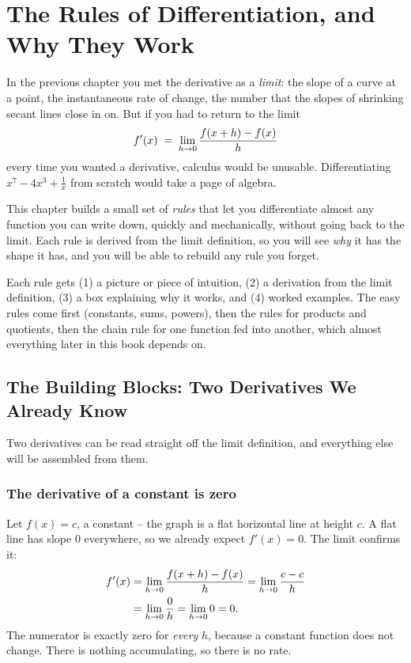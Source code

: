 \chapter{The Rules of Differentiation, and Why They Work}

In the previous chapter you met the derivative as a \emph{limit}: the slope of a curve
at a point, the instantaneous rate of change, the number that the slopes of shrinking
secant lines close in on. But if you had to return to
the limit
\[
  f'(x) \;=\; \lim_{h\to 0}\frac{f(x+h)-f(x)}{h}
\]
every time you wanted a derivative, calculus would be unusable. Differentiating
$x^7 - 4x^3 + \tfrac{1}{x}$ from scratch would take a page of algebra.

This chapter builds a small set of \emph{rules} that let you differentiate almost any
function you can write down, quickly and mechanically, without going back to the limit.
Each rule is derived from the limit definition, so you will see \emph{why} it has the
shape it has, and you will be able to rebuild any rule you forget.

\begin{focusbox}
Each rule gets (1) a picture or piece of intuition, (2) a derivation from the limit
definition, (3) a box explaining why it works, and (4) worked examples. The easy rules
come first (constants, sums, powers), then the rules for products and quotients, then
the chain rule for one function fed into another, which almost everything later in this
book depends on.
\end{focusbox}

\section{The Building Blocks: Two Derivatives We Already Know}
\label{ch11:building-blocks}

Two derivatives can be read straight off the limit definition, and everything else will
be assembled from them.

\subsection{The derivative of a constant is zero}

Let $f(x) = c$, a constant -- the graph is a flat horizontal line at height $c$. A flat
line has slope $0$ everywhere, so we already expect $f'(x)=0$. The limit confirms it:
\begin{align*}
  f'(x) &= \lim_{h\to 0}\frac{f(x+h)-f(x)}{h}
         = \lim_{h\to 0}\frac{c - c}{h} \\
        &= \lim_{h\to 0}\frac{0}{h}
         = \lim_{h\to 0} 0 = 0.
\end{align*}
The numerator is exactly zero for \emph{every} $h$, because a constant function does not
change. There is nothing accumulating, so there is no rate.

